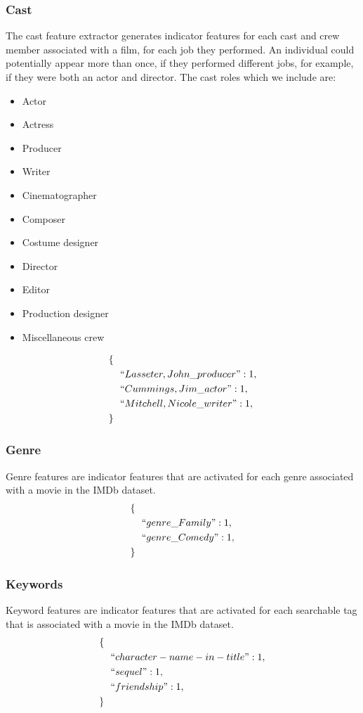 \documentclass[journal]{IEEEtran}
\begin{document}
\subsubsection{Cast}
The cast feature extractor generates indicator features for each
cast and crew member associated with a film, for each job they
performed.  An individual could potentially appear more than once,
if they performed different jobs, for example, if they were both
an actor and director.  The cast roles which we include are:
\begin{itemize}
	\item Actor
	\item Actress
	\item Producer
	\item Writer
	\item Cinematographer
	\item Composer
	\item Costume designer
	\item Director
	\item Editor
	\item Production designer
	\item Miscellaneous crew
\end{itemize}
\begin{align*}
        \{ \ \ & \\
        &``Lasseter,John\_producer": 1,\\
        &``Cummings,Jim\_actor": 1,\\
        &``Mitchell,Nicole\_writer": 1,\\
        \} \ \ &
\end{align*}

\subsubsection{Genre}
Genre features are indicator features that are activated for each
genre associated with a movie in the IMDb dataset.
\begin{align*}
        \{\ \ &\\
        &``genre\_Family": 1,\\
        &``genre\_Comedy": 1,\\
        \}\ \ &
\end{align*}

\subsubsection{Keywords}
Keyword features are indicator features that are activated for
each searchable tag that is associated with a movie in the
IMDb dataset.
\begin{align*}
        \{\ \ &\\
        &``character-name-in-title": 1,\\
        &``sequel": 1,\\
        &``friendship": 1,\\
        \}\ \ &
\end{align*}
\end{document}
